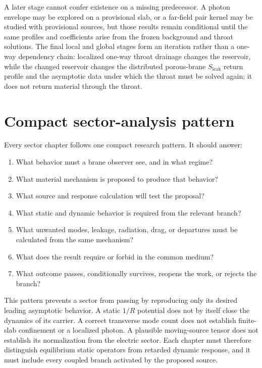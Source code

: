 A later stage cannot confer existence on a missing predecessor. A photon
envelope may be explored on a provisional slab, or a far-field pair kernel may
be studied with provisional sources, but those results remain conditional until
the same profiles and coefficients arise from the frozen background and throat
solutions. The final local and global stages form an iteration rather than a
one-way dependency chain: localized one-way throat drainage changes the
reservoir, while the changed reservoir changes the distributed porous-brane
\(S_{\mathrm{leak}}\) return profile and the asymptotic data under which the
throat must be solved again; it does not return material through the throat.

\section{Compact sector-analysis pattern}

Every sector chapter follows one compact research pattern. It should answer:

\begin{enumerate}[leftmargin=2.2em,label=\textbf{\arabic*.},itemsep=0.42em]
  \item What behavior must a brane observer see, and in what regime?
  \item What material mechanism is proposed to produce that behavior?
  \item What source and response calculation will test the proposal?
  \item What static and dynamic behavior is required from the relevant branch?
  \item What unwanted modes, leakage, radiation, drag, or departures must be
        calculated from the same mechanism?
  \item What does the result require or forbid in the common medium?
  \item What outcome passes, conditionally survives, reopens the work, or
        rejects the branch?
\end{enumerate}

This pattern prevents a sector from passing by reproducing only its desired
leading asymptotic behavior. A static \(1/R\) potential does not by itself close
the dynamics of its carrier. A correct transverse mode count does not establish
finite-slab confinement or a localized photon. A plausible moving-source tensor
does not establish its normalization from the electric sector. Each chapter
must therefore distinguish equilibrium static operators from retarded dynamic
response, and it must include every coupled branch activated by the proposed
source.

